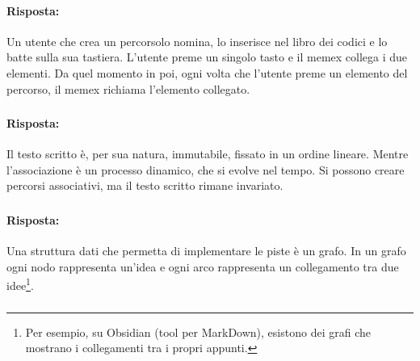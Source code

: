 \paragraph{Risposta:} Un utente che crea un percorsolo nomina, lo inserisce nel libro dei codici e 
lo batte sulla sua tastiera. L'utente preme un singolo tasto e il memex collega i due elementi.
Da quel momento in poi, ogni volta che l'utente preme un elemento del percorso, il memex richiama
l'elemento collegato.

\subsubsection{}


\paragraph{Risposta:} Il testo scritto è, per sua natura, immutabile, fissato in un ordine lineare. Mentre l'associazione è 
un processo dinamico, che si evolve nel tempo. Si possono creare percorsi associativi, ma il testo scritto rimane invariato.

\subsubsection{}


\paragraph{Risposta:} Una struttura dati che permetta di implementare le piste è un grafo. In un grafo
ogni nodo rappresenta un'idea e ogni arco rappresenta un collegamento tra due idee\footnote{Per esempio, su Obsidian (tool per MarkDown), esistono dei grafi che mostrano i collegamenti tra i propri appunti.}.

\subsubsection{}


